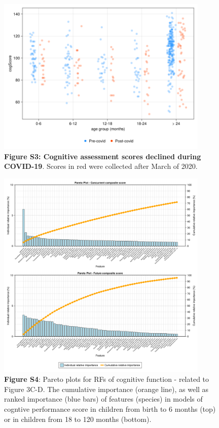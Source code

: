 \documentclass{article}
\begin{document}
\begin{figure}[h]
    \centering
    \includegraphics[width=0.9\textwidth]{assets/Supp_Figure3.png}
    \captionsetup{labelformat=empty}
    \caption{
        \textbf{Figure S3: Cognitive assessment scores declined during COVID-19}. Scores in red were collected after March of 2020.
    }
\end{figure}

\begin{figure}[h]
  \centering
  \includegraphics[width=0.9\textwidth]{assets/Supp_Figure4.png}
  \captionsetup{labelformat=empty}
  \caption{
      \textbf{Figure S4}: Pareto plots for RFs of cognitive function - related to Figure 3C-D.
      The cumulative importance (orange line), as well as ranked importance (blue bars)
      of features (species) in models of cogntive performance score
      in children from birth to 6 months (top) or
      in children from 18 to 120 months (bottom).
  }
\end{figure}
\end{document}
